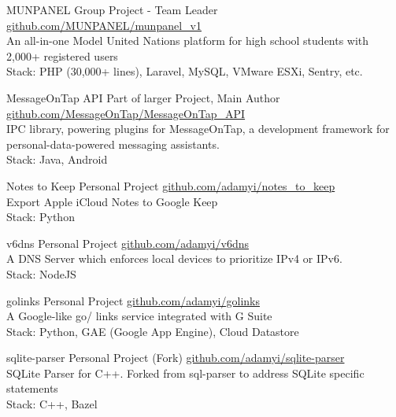 \documentclass[hidelinks__VERSION__]{adamyi-cv}
\begin{document}
\begin{entrylist}


\entry
{MUNPANEL}
{Group Project - Team Leader}
{\href{https://github.com/MUNPANEL/munpanel_v1}{github.com/MUNPANEL/munpanel\_v1}\\
An all-in-one Model United Nations platform for high school students with 2,000+ registered users\\
Stack: PHP (30,000+ lines), Laravel, MySQL, VMware ESXi, Sentry, etc.
}


\entry
{MessageOnTap API}
{Part of larger Project, Main Author}
{\href{https://github.com/MessageOnTap/MessageOnTap_API}{github.com/MessageOnTap/MessageOnTap\_API}\\
IPC library, powering plugins for MessageOnTap, a development framework for personal-data-powered messaging assistants.\\
Stack: Java, Android
}


\entry
{Notes to Keep}
{Personal Project}
{\href{https://github.com/adamyi/notes_to_keep}{github.com/adamyi/notes\_to\_keep}\\
Export Apple iCloud Notes to Google Keep\\
Stack: Python
}


\entry
{v6dns}
{Personal Project}
{\href{https://github.com/adamyi/v6dns}{github.com/adamyi/v6dns}\\
A DNS Server which enforces local devices to prioritize IPv4 or IPv6.\\
Stack: NodeJS
}


\entry
{golinks}
{Personal Project}
{\href{https://github.com/adamyi/golinks}{github.com/adamyi/golinks}\\
A Google-like go/ links service integrated with G Suite\\
Stack: Python, GAE (Google App Engine), Cloud Datastore
}


\entry
{sqlite-parser}
{Personal Project (Fork)}
{\href{https://github.com/adamyi/sqlite-parser}{github.com/adamyi/sqlite-parser}\\
SQLite Parser for C++. Forked from sql-parser to address SQLite specific statements\\
Stack: C++, Bazel
}


\end{entrylist}
\end{document}
